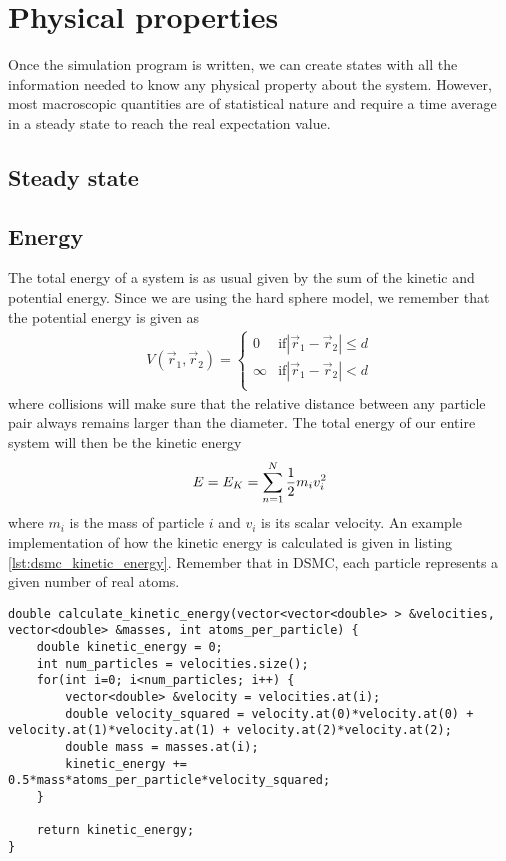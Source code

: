 \section{Physical properties}
Once the simulation program is written, we can create states with all the information needed to know any physical property about the system. However, most macroscopic quantities are of statistical nature and require a time average in a steady state to reach the real expectation value. 
\subsection{Steady state}

\subsection{Energy}
The total energy of a system is as usual given by the sum of the kinetic and potential energy. Since we are using the hard sphere model, we remember that the potential energy is given as
\begin{align}
	V(\vec r_1, \vec r_2) = \left\{
	\begin{array}{lr}
	0 & \text{if} |\vec r_1  - \vec r_2| \leq d\\
	\infty & \text{if} |\vec r_1  - \vec r_2| < d\\
	\end{array}
	\right .
\end{align}
where collisions will make sure that the relative distance between any particle pair always remains larger than the diameter. The total energy of our entire system will then be the kinetic energy
\begin{align}
	E = E_K = \sum_{n=1}^N {1\over 2}m_iv_i^2
\end{align}
where $m_i$ is the mass of particle $i$ and $v_i$ is its scalar velocity. An example implementation of how the kinetic energy is calculated is given in listing \ref{lst:dsmc_kinetic_energy}. Remember that in DSMC, each particle represents a given number of real atoms.

\begin{lstlisting}[caption=Calculation of kinetic energy., label=lst:dsmc_kinetic_energy]
double calculate_kinetic_energy(vector<vector<double> > &velocities, vector<double> &masses, int atoms_per_particle) {
	double kinetic_energy = 0;
	int num_particles = velocities.size();
	for(int i=0; i<num_particles; i++) {
		vector<double> &velocity = velocities.at(i);
		double velocity_squared = velocity.at(0)*velocity.at(0) + velocity.at(1)*velocity.at(1) + velocity.at(2)*velocity.at(2);
		double mass = masses.at(i);
		kinetic_energy += 0.5*mass*atoms_per_particle*velocity_squared;
	}

	return kinetic_energy;
}
\end{lstlisting}

